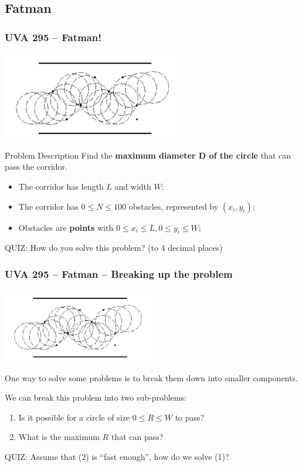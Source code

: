 \subsection{Fatman}
\begin{frame}
  \frametitle{UVA 295 -- Fatman!}
  \begin{center}
    \includegraphics[width=0.6\textwidth]{img/fatman}
  \end{center}

  {\smaller
    \begin{block}{Problem Description}
      Find the {\bf maximum diameter D of the circle} that can pass the corridor.
      \begin{itemize}
      \item The corridor has length $L$ and width $W$;
      \item The corridor has $0 \leq N \leq 100$ obstacles, represented by $(x_i,y_i)$;
      \item Obstacles are {\bf points} with $0 \leq x_i \leq L, 0\leq y_i \leq W$;
      \end{itemize}
    \end{block}

    \alert{QUIZ:} How do you solve this problem? (to 4 decimal places)
  }
\end{frame}

\begin{frame}
  \frametitle{UVA 295 -- Fatman -- Breaking up the problem}
  \begin{center}
    \includegraphics[width=0.5\textwidth]{img/fatman}
  \end{center}

  {\smaller
  One way to solve some problems is to break them down into smaller
  components.

  \bigskip

  We can break this problem into two sub-problems:
  \begin{block}{}
  \begin{enumerate}
  \item Is it possible for a circle of size $0 \leq R \leq W$ to pass?
  \item What is the maximum $R$ that can pass?
  \end{enumerate}
  \end{block}

  \alert{QUIZ}: Assume that (2) is ``fast enough'', how do we solve (1)?
  }
\end{frame}

